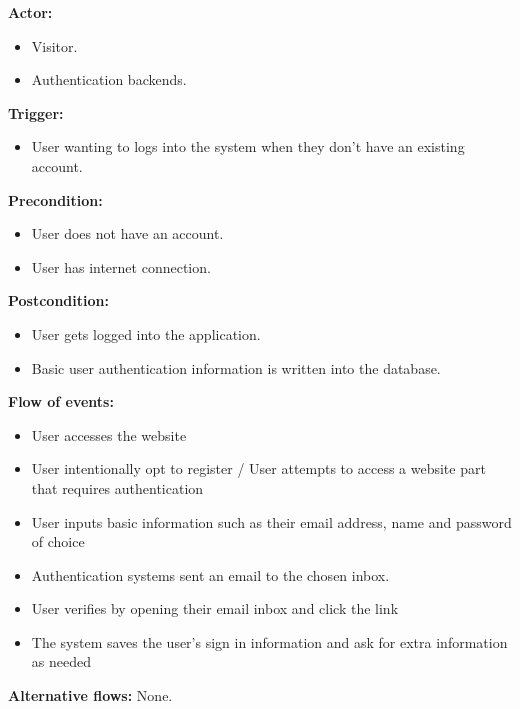 \documentclass[a4paper]{article}
\begin{document}
        \textbf{Actor:}
        \begin{itemize}
            \item Visitor.
            \item Authentication backends.
        \end{itemize}

        \textbf{Trigger:}
        \begin{itemize}
            \item User wanting to logs into the system when they don't have an existing account.
        \end{itemize}

        \textbf{Precondition:}
        \begin{itemize}
            \item User does not have an account.
            \item User has internet connection.
        \end{itemize}

        \textbf{Postcondition:}
        \begin{itemize}
            \item User gets logged into the application.
            \item Basic user authentication information is written into the database.
        \end{itemize}

        \textbf{Flow of events:}
        \begin{itemize}
            \item User accesses the website
            \item User intentionally opt to register / User attempts to access a website part that requires authentication
            \item User inputs basic information such as their email address, name and password of choice
            \item Authentication systems sent an email to the chosen inbox.
            \item User verifies by opening their email inbox and click the link
            \item The system saves the user's sign in information and ask for extra information as needed
        \end{itemize}

        \textbf{Alternative flows:}
        None.
\end{document}
